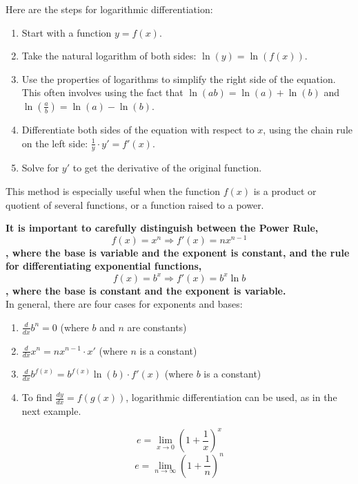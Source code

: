 \documentclass{article}
\begin{document}
Here are the steps for logarithmic differentiation:

\begin{enumerate}
\item Start with a function \(y = f(x)\).
\item Take the natural logarithm of both sides: \(\ln(y) = \ln(f(x))\).
\item Use the properties of logarithms to simplify the right side of the equation. This often involves using the fact that \(\ln(ab) = \ln(a) + \ln(b)\) and \(\ln\left(\frac{a}{b}\right) = \ln(a) - \ln(b)\).
\item Differentiate both sides of the equation with respect to \(x\), using the chain rule on the left side: \(\frac{1}{y} \cdot y' = f'(x)\).
\item Solve for \(y'\) to get the derivative of the original function.
\end{enumerate}

This method is especially useful when the function \(f(x)\) is a product or quotient of several functions, or a function raised to a power.


\textbf{It is important to carefully distinguish between the Power Rule, \[f(x) = x^n \Rightarrow f'(x) = nx^{n-1}\], where the base is variable and the exponent is constant, and the rule for differentiating exponential functions, \[f(x) = b^x \Rightarrow f'(x) = b^x \ln b\], where the base is constant and the exponent is variable.}
\\In general, there are four cases for exponents and bases:

\begin{enumerate}
\item \(\frac{d}{dx} b^n = 0\) (where \(b\) and \(n\) are constants)
\item \(\frac{d}{dx} x^n = nx^{n-1} \cdot x'\) (where \(n\) is a constant)
\item \(\frac{d}{dx} b^{f(x)} = b^{f(x)} \ln(b) \cdot f'(x)\) (where \(b\) is a constant)
\item To find \(\frac{dy}{dx} = f(g(x))\), logarithmic differentiation can be used, as in the next example.
\end{enumerate}

\[e = \lim_{{x \to 0}} \left(1 + \frac{1}{x}\right)^x\]
\[e = \lim_{{n \to \infty}} \left(1 + \frac{1}{n}\right)^n\]
\end{document}
